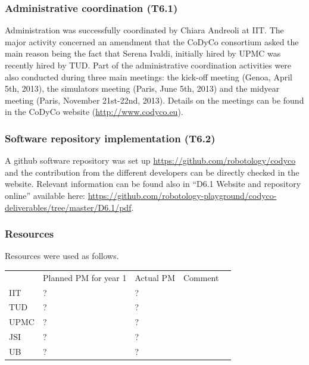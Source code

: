 \documentclass[12pt,a4paper,twoside]{article}
\begin{document}
\subsubsection{Administrative coordination (T6.1)}
Administration was successfully coordinated by Chiara Andreoli at IIT. The major activity concerned an amendment that the CoDyCo consortium asked the main reason being the fact that Serena Ivaldi, initially hired by UPMC was recently hired by TUD. Part of the administrative coordination activities were also conducted during three main meetings: the kick-off meeting (Genoa, April 5th, 2013), the simulators meeting (Paris, June 5th, 2013) and the midyear meeting (Paris, November 21st-22nd, 2013). Details on the meetings can be found in the CoDyCo website (\url{http://www.codyco.eu}).

\subsubsection{Software repository implementation (T6.2)}

A github software repository was set up \url{https://github.com/robotology/codyco} and the contribution from the different developers can be directly checked in the website. Relevant information can be found also in ``D6.1 Website and repository online'' available here: \url{https://github.com/robotology-playground/codyco-deliverables/tree/master/D6.1/pdf}.

\subsubsection{Resources}

Resources were used as follows.

\begin{center}
\begin{tabular}{|l|l|l|l|l}
\cline{1-4}
 & Planned PM for year 1 & Actual PM & Comment & \\ \cline{1-4}
IIT        & ? & ? &  &  \\ \cline{1-4}
TUD    & ? & ? &  &  \\ \cline{1-4}
UPMC & ? & ? &  &  \\ \cline{1-4}
JSI       & ? & ? &  &  \\ \cline{1-4}
UB       & ? & ? &  &  \\ \cline{1-4}
\end{tabular}
\end{center}
\end{document}
